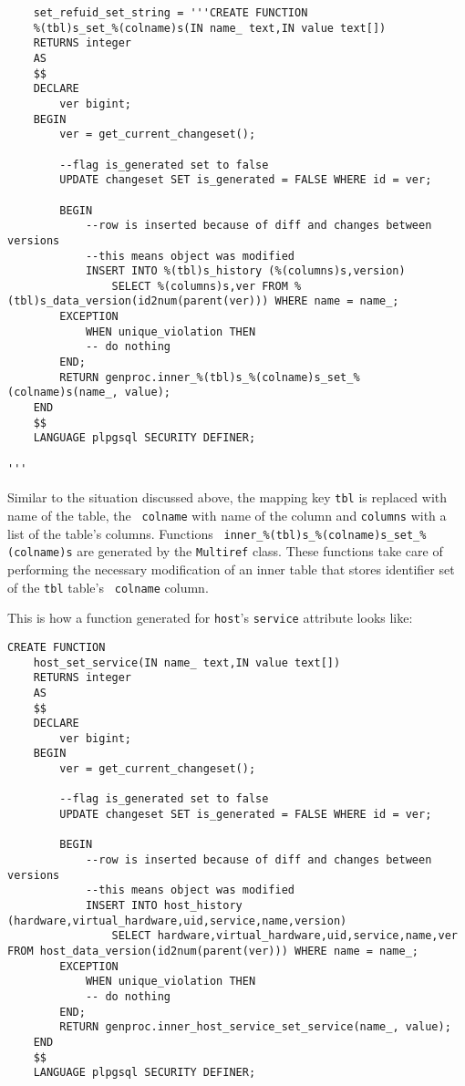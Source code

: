 \documentclass[deska]{subfiles}
\begin{document}
\begin{verbatim}
    set_refuid_set_string = '''CREATE FUNCTION
    %(tbl)s_set_%(colname)s(IN name_ text,IN value text[])
    RETURNS integer
    AS
    $$
    DECLARE
        ver bigint;
    BEGIN
        ver = get_current_changeset();

        --flag is_generated set to false
        UPDATE changeset SET is_generated = FALSE WHERE id = ver;

        BEGIN
            --row is inserted because of diff and changes between versions
            --this means object was modified
            INSERT INTO %(tbl)s_history (%(columns)s,version)
                SELECT %(columns)s,ver FROM %(tbl)s_data_version(id2num(parent(ver))) WHERE name = name_;
        EXCEPTION
            WHEN unique_violation THEN
            -- do nothing
        END;
        RETURN genproc.inner_%(tbl)s_%(colname)s_set_%(colname)s(name_, value);
    END
    $$
    LANGUAGE plpgsql SECURITY DEFINER;

'''
\end{verbatim}

Similar to the situation discussed above, the mapping key {\tt tbl} is replaced with name of the table, the {\tt
colname} with name of the column and {\tt columns} with a list of the table's columns.  Functions {\tt
inner\_\%(tbl)s\_\%(colname)s\_set\_\%(colname)s} are generated by the {\tt Multiref} class.   These functions take care
of performing the necessary modification of an inner table that stores identifier set of the {\tt tbl} table's {\tt
colname} column.

This is how a function generated for {\tt host}'s {\tt service} attribute looks like:

\begin{verbatim}
CREATE FUNCTION
    host_set_service(IN name_ text,IN value text[])
    RETURNS integer
    AS
    $$
    DECLARE
        ver bigint;
    BEGIN
        ver = get_current_changeset();

        --flag is_generated set to false
        UPDATE changeset SET is_generated = FALSE WHERE id = ver;

        BEGIN
            --row is inserted because of diff and changes between versions
            --this means object was modified
            INSERT INTO host_history (hardware,virtual_hardware,uid,service,name,version)
                SELECT hardware,virtual_hardware,uid,service,name,ver FROM host_data_version(id2num(parent(ver))) WHERE name = name_;
        EXCEPTION
            WHEN unique_violation THEN
            -- do nothing
        END;
        RETURN genproc.inner_host_service_set_service(name_, value);
    END
    $$
    LANGUAGE plpgsql SECURITY DEFINER;
\end{verbatim}
\end{document}
